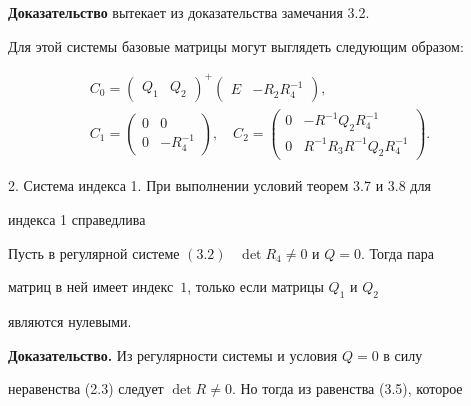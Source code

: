  


{\bf Доказательство} вытекает из доказательства замечания 3.2. 


 


Для этой системы базовые матрицы могут выглядеть следующим образом: 


\begin{gather*} 


C_0=\begin{pmatrix}Q_1 & Q_2 \end{pmatrix}^+ 


\begin{pmatrix}E & -R_2R^{-1}_4 \end{pmatrix},\\ 


C_1=\begin{pmatrix} 0 & 0 \\ 0 & -R^{-1}_4 \end{pmatrix},\quad 


C_2=\begin{pmatrix} 


0 & -R^{-1}Q_2R^{-1}_4\\ 


0 & R^{-1}R_3R^{-1}Q_2R^{-1}_4 


\end{pmatrix}. 


\end{gather*} 


 


2. Система индекса 1. При выполнении условий теорем 3.7 и 3.8 для 


индекса 1 справедлива 


 


\begin{thms} 


Пусть в регулярной системе $(3.2)$ \ $\det R_4\ne0$ и $Q=0$. Тогда пара 


матриц в ней имеет индекс~$1$, только если матрицы $Q_1$ и $Q_2$ 


являются нулевыми. 


\end{thms} 


 


{\bf Доказательство.} Из регулярности системы и условия $Q=0$ в силу 


неравенства (2.3) следует $\det R\ne0$. Но тогда из равенства (3.5), которое 



